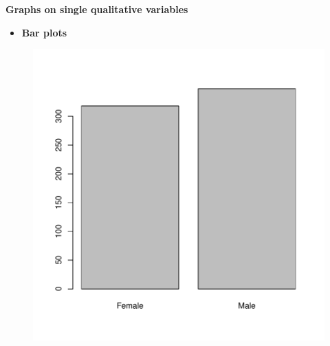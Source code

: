 \documentclass[xcolor=dvipsnames]{beamer}
\begin{document}
\begin{frame}[fragile]{\textbf{Graphs on single qualitative variables}}
\begin{itemize}
\item \textbf{Bar plots}
\end{itemize}
\begin{center}
\begin{figure}
\centering
\begin{Schunk}
\end{Schunk}
\includegraphics{lesson3_graphs_presentation-006}
\end{figure}
\end{center}

\end{frame}
\end{document}
